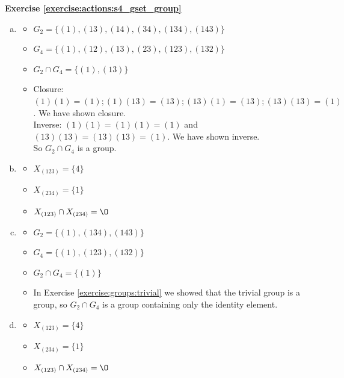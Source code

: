 \noindent\textbf{Exercise \ref{exercise:actions:s4_gset_group}}
\begin{enumerate}[(a)]
\item
	\begin{itemize}
	\item
	$G_2 = \{(1), (13), (14), (34), (134), (143)\}$
	
	\item
	$G_4 = \{(1), (12), (13), (23), (123), (132)\}$
	
	\item
	$G_2 \cap G_4 = \{(1), (13)\}$
	
	\item
	Closure: $(1)(1) = (1); (1)(13) = (13); (13)(1) = (13); (13)(13) = (1)$. We have shown closure.
	\\
	Inverse: $(1)(1) = (1)(1) = (1)$ and $(13)(13) = (13)(13) = (1)$. We have shown inverse.
	\\
	So $G_2 \cap G_4$ is a group.
	\end{itemize}
	
\item
	\begin{itemize}
	\item
	$X_{(123)} = \{4\}$
	
	\item
	$X_{(234)} = \{1\}$
	
	\item
	$X_{(123)} \cap X_{(234)} = \O$
	\end{itemize}
	
\item
	\begin{itemize}
	\item
	$G_2 = \{(1), (134), (143)\}$
	
	\item
	$G_4 = \{(1), (123), (132)\}$
	
	\item
	$G_2 \cap G_4 = \{(1)\}$
	
	\item
	In Exercise \ref{exercise:groups:trivial} we showed that the trivial group is a group, so $G_2 \cap G_4$ is a group containing only the identity element.
	\end{itemize}
	
\item
	\begin{itemize}
	\item
	$X_{(123)} = \{4\}$
	
	\item
	$X_{(234)} = \{1\}$
	
	\item
	$X_{(123)} \cap X_{(234)} = \O$
	\end{itemize}
\end{enumerate}

